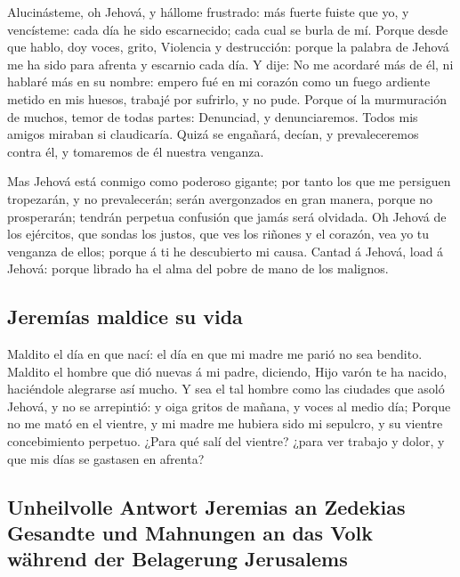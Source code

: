  Alucinásteme, oh Jehová, y hállome frustrado: más fuerte
fuiste que yo, y vencísteme: cada día he sido escarnecido; cada cual se
burla de mí.  Porque desde que hablo, doy voces, grito,
Violencia y destrucción: porque la palabra de Jehová me ha sido para
afrenta y escarnio cada día.  Y dije: No me acordaré más
de él, ni hablaré más en su nombre: empero fué en mi corazón como un
fuego ardiente metido en mis huesos, trabajé por sufrirlo, y no pude.
 Porque oí la murmuración de muchos, temor de todas
partes: Denunciad, y denunciaremos. Todos mis amigos miraban si
claudicaría. Quizá se engañará, decían, y prevaleceremos contra él, y
tomaremos de él nuestra venganza.

 Mas Jehová está conmigo como poderoso gigante; por tanto
los que me persiguen tropezarán, y no prevalecerán; serán avergonzados
en gran manera, porque no prosperarán; tendrán perpetua confusión que
jamás será olvidada.  Oh Jehová de los ejércitos, que
sondas los justos, que ves los riñones y el corazón, vea yo tu venganza
de ellos; porque á ti he descubierto mi causa.  Cantad á
Jehová, load á Jehová: porque librado ha el alma del pobre de mano de
los malignos.

\hypertarget{jeremuxedas-maldice-su-vida}{%
\subsection{Jeremías maldice su
vida}\label{jeremuxedas-maldice-su-vida}}

 Maldito el día en que nací: el día en que mi madre me
parió no sea bendito.  Maldito el hombre que dió nuevas á
mi padre, diciendo, Hijo varón te ha nacido, haciéndole alegrarse así
mucho.  Y sea el tal hombre como las ciudades que asoló
Jehová, y no se arrepintió: y oiga gritos de mañana, y voces al medio
día;  Porque no me mató en el vientre, y mi madre me
hubiera sido mi sepulcro, y su vientre concebimiento perpetuo.
 ¿Para qué salí del vientre? ¿para ver trabajo y dolor, y
que mis días se gastasen en afrenta?

\hypertarget{unheilvolle-antwort-jeremias-an-zedekias-gesandte-und-mahnungen-an-das-volk-wuxe4hrend-der-belagerung-jerusalems}{%
\subsection{Unheilvolle Antwort Jeremias an Zedekias Gesandte und
Mahnungen an das Volk während der Belagerung
Jerusalems}\label{unheilvolle-antwort-jeremias-an-zedekias-gesandte-und-mahnungen-an-das-volk-wuxe4hrend-der-belagerung-jerusalems}}

